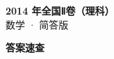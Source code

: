 \documentclass[zihao=-4, a4paper]{ctexart}
\begin{document}
\begin{center}
  {\Large\bfseries 2014 年全国Ⅱ卷（理科）}\\[4pt]
  {\large 数学 · 简答版}
\end{center}
\medskip
{}

\clearpage
{}
\begin{center}{\Large\bfseries 答案速查}\end{center}
\medskip

\end{document}

